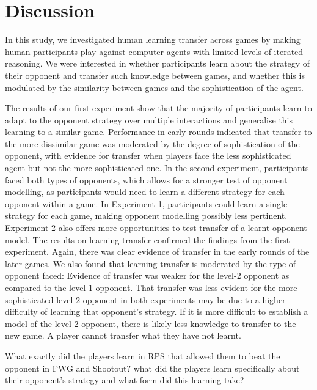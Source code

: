 \documentclass[
  english,
  man,floatsintext]{apa6}
\begin{document}
\hypertarget{discussion-2}{%
\section{Discussion}\label{discussion-2}}

In this study, we investigated human learning transfer across games by making human participants play against computer agents with limited levels of iterated reasoning. We were interested in whether participants learn about the strategy of their opponent and transfer such knowledge between games, and whether this is modulated by the similarity between games and the sophistication of the agent.

The results of our first experiment show that the majority of participants learn to adapt to the opponent strategy over multiple interactions and generalise this learning to a similar game. Performance in early rounds indicated that transfer to the more dissimilar game was moderated by the degree of sophistication of the opponent, with evidence for transfer when players face the less sophisticated agent but not the more sophisticated one. In the second experiment, participants faced both types of opponents, which allows for a stronger test of opponent modelling, as participants would need to learn a different strategy for each opponent within a game. In Experiment 1, participants could learn a single strategy for each game, making opponent modelling possibly less pertinent. Experiment 2 also offers more opportunities to test transfer of a learnt opponent model. The results on learning transfer confirmed the findings from the first experiment. Again, there was clear evidence of transfer in the early rounds of the later games. We also found that learning transfer is moderated by the type of opponent faced: Evidence of transfer was weaker for the level-2 opponent as compared to the level-1 opponent. That transfer was less evident for the more sophisticated level-2 opponent in both experiments may be due to a higher difficulty of learning that opponent's strategy. If it is more difficult to establish a model of the level-2 opponent, there is likely less knowledge to transfer to the new game. A player cannot transfer what they have not learnt.

What exactly did the players learn in RPS that allowed them to beat the opponent in FWG and Shootout? what did the players learn specifically about their opponent's strategy and what form did this learning take?
\end{document}
